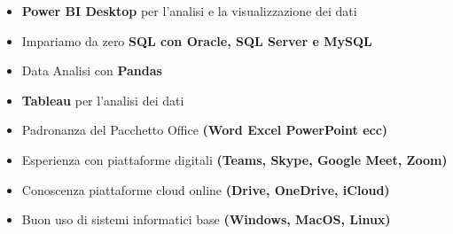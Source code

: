 \documentclass[10pt,a4paper]{altacv}
\begin{document}
\begin{itemize}
    \item \textbf{Power BI Desktop} per l'analisi e la visualizzazione dei dati
    \item Impariamo da zero \textbf{SQL con Oracle, SQL Server e MySQL}
    \item Data Analisi con \textbf{Pandas}
    \item \textbf{Tableau} per l'analisi dei dati
\end{itemize}
\begin{itemize}
  \item Padronanza del Pacchetto Office \textbf{(Word Excel PowerPoint ecc)}
  \item Esperienza con piattaforme digitali \textbf{(Teams, Skype, Google Meet, Zoom)}
  \item Conoscenza piattaforme cloud online \textbf{(Drive, OneDrive, iCloud)}
  \item Buon uso di sistemi informatici base \textbf{(Windows, MacOS, Linux)}
\end{itemize}



\end{document}
